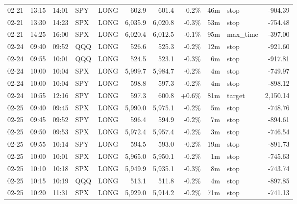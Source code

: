 \documentclass[11pt,a4paper,twoside]{article}
\begin{document}
\begin{center}
\begin{longtable}{>{\color{txtmain}}l l l l l r r r r >{\color{txtmain}}l r}
02-21 & 13:15 & 14:01 & SPY & LONG & 602.9 & 601.4 & \textcolor{lossred}{-0.2\%} & 46m & stop & \textcolor{lossred}{-904.39} \\
02-21 & 13:30 & 14:23 & SPX & LONG & 6,035.9 & 6,020.8 & \textcolor{lossred}{-0.3\%} & 53m & stop & \textcolor{lossred}{-754.48} \\
02-21 & 14:25 & 16:00 & SPX & LONG & 6,020.4 & 6,012.5 & \textcolor{lossred}{-0.1\%} & 95m & max\_time & \textcolor{lossred}{-397.00} \\
02-24 & 09:40 & 09:52 & QQQ & LONG & 526.6 & 525.3 & \textcolor{lossred}{-0.2\%} & 12m & stop & \textcolor{lossred}{-921.60} \\
02-24 & 09:55 & 10:01 & QQQ & LONG & 524.5 & 523.1 & \textcolor{lossred}{-0.3\%} & 6m & stop & \textcolor{lossred}{-917.81} \\
02-24 & 10:00 & 10:04 & SPX & LONG & 5,999.7 & 5,984.7 & \textcolor{lossred}{-0.2\%} & 4m & stop & \textcolor{lossred}{-749.97} \\
02-24 & 10:00 & 10:04 & SPY & LONG & 598.8 & 597.3 & \textcolor{lossred}{-0.2\%} & 4m & stop & \textcolor{lossred}{-898.12} \\
02-24 & 10:55 & 12:16 & SPY & LONG & 597.3 & 600.8 & \textcolor{wingreen}{+0.6\%} & 81m & target & \textcolor{wingreen}{2,150.14} \\
02-25 & 09:40 & 09:45 & SPX & LONG & 5,990.0 & 5,975.1 & \textcolor{lossred}{-0.2\%} & 5m & stop & \textcolor{lossred}{-748.76} \\
02-25 & 09:45 & 09:52 & SPY & LONG & 596.4 & 594.9 & \textcolor{lossred}{-0.2\%} & 7m & stop & \textcolor{lossred}{-894.61} \\
02-25 & 09:50 & 09:53 & SPX & LONG & 5,972.4 & 5,957.4 & \textcolor{lossred}{-0.2\%} & 3m & stop & \textcolor{lossred}{-746.54} \\
02-25 & 09:55 & 10:14 & SPY & LONG & 594.5 & 593.0 & \textcolor{lossred}{-0.2\%} & 19m & stop & \textcolor{lossred}{-891.73} \\
02-25 & 10:00 & 10:01 & SPX & LONG & 5,965.0 & 5,950.1 & \textcolor{lossred}{-0.2\%} & 1m & stop & \textcolor{lossred}{-745.63} \\
02-25 & 10:10 & 10:18 & SPX & LONG & 5,949.9 & 5,935.1 & \textcolor{lossred}{-0.3\%} & 8m & stop & \textcolor{lossred}{-743.74} \\
02-25 & 10:15 & 10:19 & QQQ & LONG & 513.1 & 511.8 & \textcolor{lossred}{-0.2\%} & 4m & stop & \textcolor{lossred}{-897.85} \\
02-25 & 10:20 & 11:31 & SPX & LONG & 5,929.0 & 5,914.2 & \textcolor{lossred}{-0.2\%} & 71m & stop & \textcolor{lossred}{-741.13} \\

\end{longtable}
\end{center}
\end{document}
